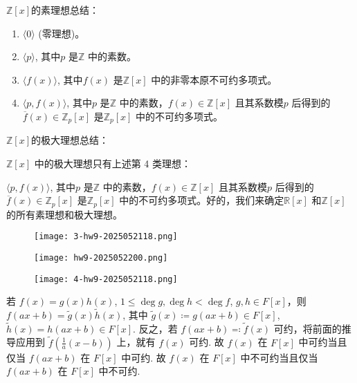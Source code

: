 $\mathbb{Z}[x]$的素理想总结：

\begin{enumerate}
	\item $\langle 0\rangle$ (零理想)。
	\item $\langle p\rangle$, 其中$p$ 是$\mathbb{Z}$ 中的素数。
	\item $\langle f(x)\rangle$, 其中$f(x)$ 是$\mathbb{Z}[x]$ 中的非零本原不可约多项式。
	\item $\langle p,f(x)\rangle$, 其中$p$ 是$\mathbb{Z}$ 中的素数，$f(x)\in\mathbb{Z}[x]$ 且其系数模$p$ 后得到的$\overline{f}(x)\in\mathbb{Z}_p[x]$ 是$\mathbb{Z}_p[x]$ 中的不可约多项式。
\end{enumerate}

$\mathbb{Z}[x]$的极大理想总结：

$\mathbb{Z}[x]$ 中的极大理想只有上述第 4 类理想：

$\langle p,f(x)\rangle$, 其中$p$ 是$\mathbb{Z}$ 中的素数，$f(x)\in\mathbb{Z}[x]$ 且其系数模$p$ 后得到的$\overline{f}(x)\in\mathbb{Z}_p[x]$ 是$\mathbb{Z}_p[x]$ 中的不可约多项式。好的，我们来确定$\mathbb{R}[x]$ 和$\mathbb{Z}[x]$ 的所有素理想和极大理想。

\begin{exercise}
\begin{figure}[H]
\centering
\texttt{[image: 3-hw9-2025052118.png]}
\label{}
\end{figure}
\end{exercise}
\begin{figure}[H]
\centering
\texttt{[image: hw9-2025052200.png]}
\label{}
\end{figure}

\begin{exercise}
\begin{figure}[H]
\centering
\texttt{[image: 4-hw9-2025052118.png]}
\label{}
\end{figure}
\end{exercise}
若 $f(x)=g(x)h(x)$, $1\leq \deg g,\deg h<\deg f$, $g, h\in F[x]$，则 $f(ax+b)=\widetilde{g}(x)\widetilde{h}(x)$, 其中 $\widetilde{g}(x)\coloneqq g (ax+b)\in F[x]$, $\widetilde{h}(x)=h (ax+b)\in F[x]$. 反之，若 $f(ax+b)\eqqcolon\widetilde{f}(x)$ 可约，将前面的推导应用到 $\widetilde{f}\left( \frac{1}{a}(x-b) \right)$ 上，就有 $f(x)$ 可约. 故 $f(x)$ 在 $F[x]$ 中可约当且仅当 $f(ax+b)$ 在 $F[x]$ 中可约. 故 $f(x)$ 在 $F[x]$ 中不可约当且仅当 $f(ax+b)$ 在 $F[x]$ 中不可约.
